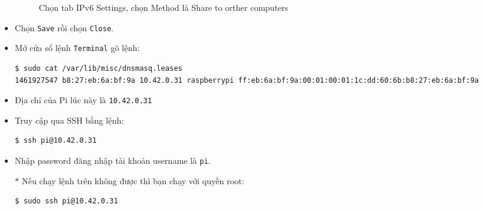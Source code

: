 \begin{itemize}
\begin{figure}[!h]
\begin{center}
\caption{Chọn tab \textsf{IPv6 Settings}, chọn \textsf{Method} là \textsf{Share to orther computers}}
\end{center}
\end{figure}
\item Chọn \verb|Save| rồi chọn \verb|Close|.
\item Mở cửa sổ lệnh \verb|Terminal| gõ lệnh:
\begin{lstlisting}[language=bash]
$ sudo cat /var/lib/misc/dnsmasq.leases
1461927547 b8:27:eb:6a:bf:9a 10.42.0.31 raspberrypi ff:eb:6a:bf:9a:00:01:00:01:1c:dd:60:6b:b8:27:eb:6a:bf:9a
\end{lstlisting}
\item Địa chỉ của Pi lúc này là \verb|10.42.0.31|
\item Truy cập qua SSH bằng lệnh:
\begin{lstlisting}[language=bash]
$ ssh pi@10.42.0.31
\end{lstlisting}
\item Nhập password đăng nhập tài khoản username là \verb|pi|.
\item[$\ast$] Nếu chạy lệnh trên không được thì bạn chạy với quyền root:
\begin{lstlisting}[language=bash]
$ sudo ssh pi@10.42.0.31
\end{lstlisting}
\end{itemize}